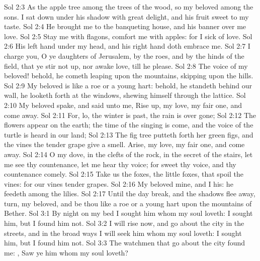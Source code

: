 \vs Sol 2:3 As the apple tree among the trees of the wood, so  my beloved among the sons. I sat down under his shadow with great delight, and his fruit  sweet to my taste.
\vs Sol 2:4 He brought me to the banqueting house, and his banner over me  love.
\vs Sol 2:5 Stay me with flagons, comfort me with apples: for I  sick of love.
\vs Sol 2:6 His left hand  under my head, and his right hand doth embrace me.
\vs Sol 2:7 I charge you, O ye daughters of Jerusalem, by the roes, and by the hinds of the field, that ye stir not up, nor awake  love, till he please.
\vs Sol 2:8 The voice of my beloved! behold, he cometh leaping upon the mountains, skipping upon the hills.
\vs Sol 2:9 My beloved is like a roe or a young hart: behold, he standeth behind our wall, he looketh forth at the windows, shewing himself through the lattice.
\vs Sol 2:10 My beloved spake, and said unto me, Rise up, my love, my fair one, and come away.
\vs Sol 2:11 For, lo, the winter is past, the rain is over  gone;
\vs Sol 2:12 The flowers appear on the earth; the time of the singing  is come, and the voice of the turtle is heard in our land;
\vs Sol 2:13 The fig tree putteth forth her green figs, and the vines  the tender grape give a  smell. Arise, my love, my fair one, and come away.
\vs Sol 2:14 O my dove,  in the clefts of the rock, in the secret  of the stairs, let me see thy countenance, let me hear thy voice; for sweet  thy voice, and thy countenance  comely.
\vs Sol 2:15 Take us the foxes, the little foxes, that spoil the vines: for our vines  tender grapes.
\vs Sol 2:16 My beloved  mine, and I  his: he feedeth among the lilies.
\vs Sol 2:17 Until the day break, and the shadows flee away, turn, my beloved, and be thou like a roe or a young hart upon the mountains of Bether.
\vs Sol 3:1 By night on my bed I sought him whom my soul loveth: I sought him, but I found him not.
\vs Sol 3:2 I will rise now, and go about the city in the streets, and in the broad ways I will seek him whom my soul loveth: I sought him, but I found him not.
\vs Sol 3:3 The watchmen that go about the city found me: , Saw ye him whom my soul loveth?
